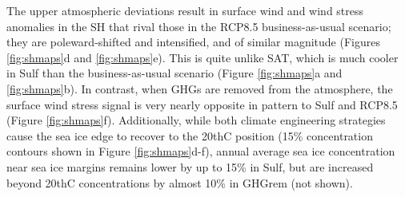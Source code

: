 \documentclass[grl]{AGUTeX}  %
\begin{document}
\begin{article}
The upper atmospheric deviations result in surface wind and wind stress anomalies in the SH that rival those in the RCP8.5 business-as-usual scenario; they are poleward-shifted and intensified, and of similar magnitude (Figures \ref{fig:shmaps}d and \ref{fig:shmaps}e). This is quite unlike SAT, which is much cooler in Sulf than the business-as-usual scenario (Figure \ref{fig:shmaps}a and \ref{fig:shmaps}b). In contrast, when GHGs are removed from the atmosphere, the surface wind stress signal is very nearly opposite in pattern to Sulf and RCP8.5 (Figure \ref{fig:shmaps}f). Additionally, while both climate engineering strategies cause the sea ice edge to recover to the 20thC position (15\% concentration contours shown in Figure \ref{fig:shmaps}d-f), annual average sea ice concentration near sea ice margins remains lower by up to 15\% in Sulf, but are increased beyond 20thC concentrations by almost 10\% in GHGrem (not shown). %


\end{article}
\end{document}
